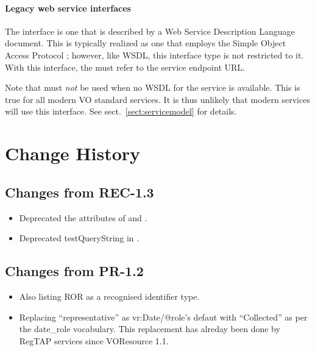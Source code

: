 \documentclass[11pt,a4paper]{ivoa}
\begin{document}

\paragraph{Legacy web service interfaces}

The  interface is one that is described by a Web
Service Description Language \citep{booth07} document. This is typically
realized as one that employs the Simple Object Access Protocol
\citep{std:SOAP}; however, like WSDL, this interface type is not
restricted to it. With this interface, the  must
refer to the service endpoint URL.

Note that  must \emph{not} be used when no WSDL for
the service is available.  This is true for all modern VO standard
services.  It is thus unlikely that modern services will use this
interface.  See sect.~\ref{sect:servicemodel} for details.

\appendix

\section{Change History}

\subsection{Changes from REC-1.3}

\begin{itemize}
\item Deprecated the  attributes of 
and .
\item Deprecated testQueryString in .
\end{itemize}


\subsection{Changes from PR-1.2}

\begin{itemize}
\item Also listing ROR as a recognised identifier type.
\item Replacing ``representative'' as vr:Date/@role's defaut with
``Collected'' as per the date\_role vocabulary.  This replacement has
alreday been done by RegTAP services since VOResource 1.1.
\end{itemize}
\end{document}
